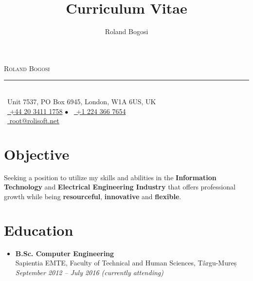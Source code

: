 \documentclass[11pt,a4paper]{article}
\author{Roland Bogosi}
\title{Curriculum Vitae}
\begin{document}
	\begin{center}
	\textsc{\Huge Roland Bogosi}\\
	\vspace{-2mm}
	\rule{300pt\color{LightGray}}{0.5px}\\
	\vspace{0.5mm}
	{\lsstyle\color{DarkGray} \faGlobe\ Unit 7537, PO Box 6945, London, W1A 6US, UK\\
	\faPhone\ \href{tel:+442034111758}{\color{DarkGray} +44 20 3411 1758} {\color{LightGray}$\bullet$} \faPhone\ \href{tel:+12243667654}{\color{DarkGray} +1 224 366 7654}\\
	\faEnvelopeO\ \href{mailto:root@rolisoft.net}{\color{DarkGray} root@rolisoft.net}}
	\end{center}

\section{Objective}
	Seeking a position to utilize my skills and abilities in the \textbf{Information Technology} and \textbf{Electrical Engineering Industry} that offers professional growth while being \textbf{resourceful}, \textbf{innovative} and \textbf{flexible}.

\section{Education}
	\begin{itemize}
	\item	{\large\textbf{B.Sc. Computer Engineering}}\\
			Sapientia EMTE, Faculty of Technical and Human Sciences, Târgu-Mureș\\
			\textit{September 2012 – July 2016 (currently attending)}
	\end{itemize}
\end{document}
